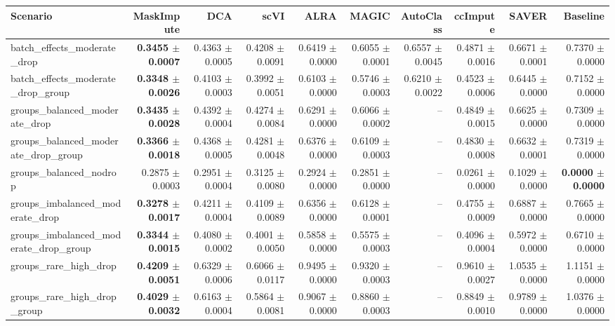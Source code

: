 \begin{tabular}{@{}lrrrrrrrrr@{}}
\toprule
Scenario & MaskImpute & DCA & scVI & ALRA & MAGIC & AutoClass & ccImpute & SAVER & Baseline \\
\midrule
batch\_effects\_moderate\_drop & \textbf{0.3455 $\pm$ 0.0007} & 0.4363 $\pm$ 0.0005 & 0.4208 $\pm$ 0.0091 & 0.6419 $\pm$ 0.0000 & 0.6055 $\pm$ 0.0001 & 0.6557 $\pm$ 0.0045 & 0.4871 $\pm$ 0.0016 & 0.6671 $\pm$ 0.0001 & 0.7370 $\pm$ 0.0000 \\
batch\_effects\_moderate\_drop\_group & \textbf{0.3348 $\pm$ 0.0026} & 0.4103 $\pm$ 0.0003 & 0.3992 $\pm$ 0.0051 & 0.6103 $\pm$ 0.0000 & 0.5746 $\pm$ 0.0003 & 0.6210 $\pm$ 0.0022 & 0.4523 $\pm$ 0.0006 & 0.6445 $\pm$ 0.0000 & 0.7152 $\pm$ 0.0000 \\
groups\_balanced\_moderate\_drop & \textbf{0.3435 $\pm$ 0.0028} & 0.4392 $\pm$ 0.0004 & 0.4274 $\pm$ 0.0084 & 0.6291 $\pm$ 0.0000 & 0.6066 $\pm$ 0.0002 & -- & 0.4849 $\pm$ 0.0015 & 0.6625 $\pm$ 0.0000 & 0.7309 $\pm$ 0.0000 \\
groups\_balanced\_moderate\_drop\_group & \textbf{0.3366 $\pm$ 0.0018} & 0.4368 $\pm$ 0.0005 & 0.4281 $\pm$ 0.0048 & 0.6376 $\pm$ 0.0000 & 0.6109 $\pm$ 0.0003 & -- & 0.4830 $\pm$ 0.0008 & 0.6632 $\pm$ 0.0001 & 0.7319 $\pm$ 0.0000 \\
groups\_balanced\_nodrop & 0.2875 $\pm$ 0.0003 & 0.2951 $\pm$ 0.0004 & 0.3125 $\pm$ 0.0080 & 0.2924 $\pm$ 0.0000 & 0.2851 $\pm$ 0.0000 & -- & 0.0261 $\pm$ 0.0000 & 0.1029 $\pm$ 0.0000 & \textbf{0.0000 $\pm$ 0.0000} \\
groups\_imbalanced\_moderate\_drop & \textbf{0.3278 $\pm$ 0.0017} & 0.4211 $\pm$ 0.0004 & 0.4109 $\pm$ 0.0089 & 0.6356 $\pm$ 0.0000 & 0.6128 $\pm$ 0.0001 & -- & 0.4755 $\pm$ 0.0009 & 0.6887 $\pm$ 0.0000 & 0.7665 $\pm$ 0.0000 \\
groups\_imbalanced\_moderate\_drop\_group & \textbf{0.3344 $\pm$ 0.0015} & 0.4080 $\pm$ 0.0002 & 0.4001 $\pm$ 0.0050 & 0.5858 $\pm$ 0.0000 & 0.5575 $\pm$ 0.0003 & -- & 0.4096 $\pm$ 0.0004 & 0.5972 $\pm$ 0.0000 & 0.6710 $\pm$ 0.0000 \\
groups\_rare\_high\_drop & \textbf{0.4209 $\pm$ 0.0051} & 0.6329 $\pm$ 0.0006 & 0.6066 $\pm$ 0.0117 & 0.9495 $\pm$ 0.0000 & 0.9320 $\pm$ 0.0003 & -- & 0.9610 $\pm$ 0.0027 & 1.0535 $\pm$ 0.0000 & 1.1151 $\pm$ 0.0000 \\
groups\_rare\_high\_drop\_group & \textbf{0.4029 $\pm$ 0.0032} & 0.6163 $\pm$ 0.0004 & 0.5864 $\pm$ 0.0081 & 0.9067 $\pm$ 0.0000 & 0.8860 $\pm$ 0.0003 & -- & 0.8849 $\pm$ 0.0010 & 0.9789 $\pm$ 0.0000 & 1.0376 $\pm$ 0.0000 \\

\end{tabular}
